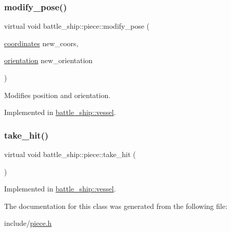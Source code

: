 \subsubsection{\texorpdfstring{modify\+\_\+pose()}{modify\_pose()}}
{\footnotesize\ttfamily virtual void battle\+\_\+ship\+::piece\+::modify\+\_\+pose (\begin{DoxyParamCaption}\item[{\hyperlink{structbattle__ship_1_1coordinates}{coordinates}}]{new\+\_\+coors,  }\item[{\hyperlink{namespacebattle__ship_aed87488f0a73f0d0679fe343fb61c784}{orientation}}]{new\+\_\+orientation }\end{DoxyParamCaption})\hspace{0.3cm}{\ttfamily [pure virtual]}}



Modifies position and orientation. 



Implemented in \hyperlink{classbattle__ship_1_1vessel_ace0ec527147243b1fa6fa920d5a32a1f}{battle\+\_\+ship\+::vessel}.

\mbox{\label{classbattle__ship_1_1piece_a77642906503e12eb22fcfbc3eab98cb5}} 
\subsubsection{\texorpdfstring{take\+\_\+hit()}{take\_hit()}}
{\footnotesize\ttfamily virtual void battle\+\_\+ship\+::piece\+::take\+\_\+hit (\begin{DoxyParamCaption}{ }\end{DoxyParamCaption})\hspace{0.3cm}{\ttfamily [pure virtual]}}



Implemented in \hyperlink{classbattle__ship_1_1vessel_ab0da3c305902d55594b7aa5d20b69509}{battle\+\_\+ship\+::vessel}.



The documentation for this class was generated from the following file\+:\begin{DoxyCompactItemize}
\item 
include/\hyperlink{piece_8h}{piece.\+h}\end{DoxyCompactItemize}
